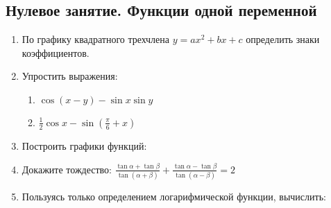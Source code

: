 \subsection*{Нулевое занятие. Функции одной переменной}
\begin{enumerate}
    \item По графику квадратного трехчлена $y = ax^2 + bx + c$ определить знаки коэффициентов.
    \item Упростить выражения:
    \begin{enumerate}
        \item $\cos (x - y) - \sin x \sin y$
        \item $\frac{1}{2} \cos x - \sin(\frac{\pi}{6} + x)$
    \end{enumerate}
    \item Построить графики функций:
    \item Докажите тождество: $\frac{\tan \alpha + \tan \beta}{\tan(\alpha + \beta)} + \frac{\tan \alpha - \tan \beta}{\tan(\alpha - \beta)} = 2$
    \item Пользуясь только определением логарифмической функции, вычислить: 
\end{enumerate}
